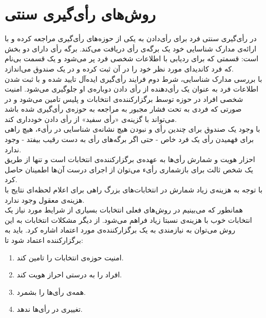 \section{روش‌های رأی‌گیری سنتی}
\par
در رأی‌گیری سنتی فرد برای رأی‌دادن به یکی از حوزه‌های رأی‌گیری مراجعه کرده و با ارائه‌ی مدارک شناسایی خود یک برگه‌ی رأی دریافت می‌کند. برگه رأی دارای دو بخش است: قسمتی که برای ردیابی با اطلاعات شخصی فرد پر می‌شود و یک قسمت بی‌نام که فرد کاندیدای مورد نظر خود را در آن ثبت کرده و در یک صندوق می‌اندازد. 
\\
با بررسی مدارک شناسایی، شرط دوم فرایند رأی‌گیری ایده‌آل تایید شده و با ثبت شدن اطلاعات فرد به عنوان یک رأی‌دهنده از رأی دادن دوباره‌ی او جلوگیری می‌شود. امنیت شخصی افراد در حوزه توسط برگزارکننده‌ی انتخابات و پلیس تامین می‌شود و در صورتی که فردی به تحت فشار مجبور به مراجعه به حوزه‌ی رأی‌گیری شده باشد می‌تواند با گزینه‌ی «رأی‌ سفید» از رأی دادن خودداری کند.
\\
با وجود یک صندوق برای چندین رأی و نبودن هیچ نشانه‌ی شناسایی در رأیء، هیچ راهی برای فهمیدن رأی یک فرد خاص - حتی اگر برگه‌های رأی به دست رقیب بیفتد - وجود ندارد. 
\\
احزار هویت و شمارش رأی‌ها به عهده‌ی برگزارکننده‌ی انتخابات است و تنها از طریق یک شخص ثالث برای باز‌شماری رأیء می‌توان از اجرای درست آن‌ها اطمینان حاصل کرد.
\\
با توجه به هزینه‌ی زیاد شمارش در انتخابات‌های بزرگ راهی برای اعلام لحظه‌ا‌ی نتایج با هزینه‌ی معقول وجود ندارد.
\\
همانطور که می‌بینیم در روش‌های فعلی انتخابات بسیاری از شرایط مورد نیاز یک انتخابات خوب  با هزینه‌ی نسبتا زیاد فراهم می‌شود. از دیگر مشکلات انتخابات به این روش می‌توان به نیازمندی به یک برگزارکننده‌ی مورد اعتماد اشاره کرد. باید به برگزارکننده اعتماد شود تا: 
\begin{enumerate}
	\item 
	امنیت حوزه‌ی انتخابات را تامین کند.
	\item 
	افراد را به درستی احراز هویت کند.
	\item 
	همه‌ی رأی‌ها را بشمرد.
	\item 
	تغییری در رأی‌ها ندهد.
	
\end{enumerate}
 

